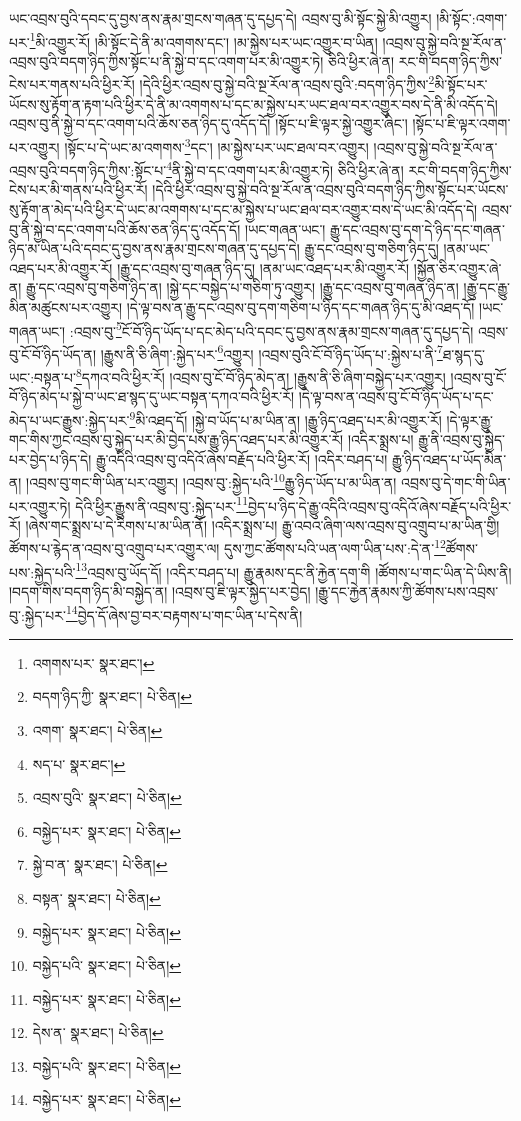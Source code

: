 ཡང་འབྲས་བུའི་དབང་དུ་བྱས་ནས་རྣམ་གྲངས་གཞན་དུ་དཔྱད་དེ། འབྲས་བུ་མི་སྟོང་སྐྱེ་མི་འགྱུར། །མི་སྟོང་:འགག་པར་\footnote{འགགས་པར་  སྣར་ཐང་། }མི་འགྱུར་རོ། །མི་སྟོང་དེ་ནི་མ་འགགས་དང་། །མ་སྐྱེས་པར་ཡང་འགྱུར་བ་ཡིན། །འབྲས་བུ་སྐྱེ་བའི་སྔ་རོལ་ན་འབྲས་བུའི་བདག་ཉིད་ཀྱིས་སྟོང་པ་ནི་སྐྱེ་བ་དང་འགག་པར་མི་འགྱུར་ཏེ། ཅིའི་ཕྱིར་ཞེ་ན། རང་གི་བདག་ཉིད་ཀྱིས་ངེས་པར་གནས་པའི་ཕྱིར་རོ། །དེའི་ཕྱིར་འབྲས་བུ་སྐྱེ་བའི་སྔ་རོལ་ན་འབྲས་བུའི་:བདག་ཉིད་ཀྱིས་\footnote{བདག་ཉིད་ཀྱི་  སྣར་ཐང་།  པེ་ཅིན། }མི་སྟོང་པར་ཡོངས་སུ་རྟོག་ན་རྟག་པའི་ཕྱིར་དེ་ནི་མ་འགགས་པ་དང་མ་སྐྱེས་པར་ཡང་ཐལ་བར་འགྱུར་བས་དེ་ནི་མི་འདོད་དེ། འབྲས་བུ་ནི་སྐྱེ་བ་དང་འགག་པའི་ཆོས་ཅན་ཉིད་དུ་འདོད་དོ། །སྟོང་པ་ཇི་ལྟར་སྐྱེ་འགྱུར་ཞིང་། །སྟོང་པ་ཇི་ལྟར་འགག་པར་འགྱུར། །སྟོང་པ་དེ་ཡང་མ་འགགས་\footnote{འགག་  སྣར་ཐང་།  པེ་ཅིན། }དང་། །མ་སྐྱེས་པར་ཡང་ཐལ་བར་འགྱུར། །འབྲས་བུ་སྐྱེ་བའི་སྔ་རོལ་ན་འབྲས་བུའི་བདག་ཉིད་ཀྱིས་:སྟོང་པ་\footnote{སད་པ་  སྣར་ཐང་། }ནི་སྐྱེ་བ་དང་འགག་པར་མི་འགྱུར་ཏེ། ཅིའི་ཕྱིར་ཞེ་ན། རང་གི་བདག་ཉིད་ཀྱིས་ངེས་པར་མི་གནས་པའི་ཕྱིར་རོ། །དེའི་ཕྱིར་འབྲས་བུ་སྐྱེ་བའི་སྔ་རོལ་ན་འབྲས་བུའི་བདག་ཉིད་ཀྱིས་སྟོང་པར་ཡོངས་སུ་རྟོག་ན་མེད་པའི་ཕྱིར་དེ་ཡང་མ་འགགས་པ་དང་མ་སྐྱེས་པ་ཡང་ཐལ་བར་འགྱུར་བས་དེ་ཡང་མི་འདོད་དེ། འབྲས་བུ་ནི་སྐྱེ་བ་དང་འགག་པའི་ཆོས་ཅན་ཉིད་དུ་འདོད་དོ། །ཡང་གཞན་ཡང་། རྒྱུ་དང་འབྲས་བུ་དག་དེ་ཉིད་དང་གཞན་ཉིད་མ་ཡིན་པའི་དབང་དུ་བྱས་ནས་རྣམ་གྲངས་གཞན་དུ་དཔྱད་དེ། རྒྱུ་དང་འབྲས་བུ་གཅིག་ཉིད་དུ། །ནམ་ཡང་འཐད་པར་མི་འགྱུར་རོ། །རྒྱུ་དང་འབྲས་བུ་གཞན་ཉིད་དུ། །ནམ་ཡང་འཐད་པར་མི་འགྱུར་རོ། །སྐྱོན་ཅིར་འགྱུར་ཞེ་ན། རྒྱུ་དང་འབྲས་བུ་གཅིག་ཉིད་ན། །སྐྱེ་དང་བསྐྱེད་པ་གཅིག་ཏུ་འགྱུར། །རྒྱུ་དང་འབྲས་བུ་གཞན་ཉིད་ན། །རྒྱུ་དང་རྒྱུ་མིན་མཚུངས་པར་འགྱུར། །དེ་ལྟ་བས་ན་རྒྱུ་དང་འབྲས་བུ་དག་གཅིག་པ་ཉིད་དང་གཞན་ཉིད་དུ་མི་འཐད་དོ། །ཡང་གཞན་ཡང་། :འབྲས་བུ་\footnote{འབྲས་བུའི་  སྣར་ཐང་།  པེ་ཅིན། }ངོ་བོ་ཉིད་ཡོད་པ་དང་མེད་པའི་དབང་དུ་བྱས་ནས་རྣམ་གྲངས་གཞན་དུ་དཔྱད་དེ། འབྲས་བུ་ངོ་བོ་ཉིད་ཡོད་ན། །རྒྱུས་ནི་ཅི་ཞིག་:སྐྱེད་པར་\footnote{བསྐྱེད་པར་  སྣར་ཐང་།  པེ་ཅིན། }འགྱུར། །འབྲས་བུའི་ངོ་བོ་ཉིད་ཡོད་པ་:སྐྱེས་པ་ནི་\footnote{སྐྱེ་བ་ན་  སྣར་ཐང་།  པེ་ཅིན། }ཐ་སྙད་དུ་ཡང་:བསྟན་པ་\footnote{བསྟན་  སྣར་ཐང་།  པེ་ཅིན། }དཀའ་བའི་ཕྱིར་རོ། །འབྲས་བུ་ངོ་བོ་ཉིད་མེད་ན། །རྒྱུས་ནི་ཅི་ཞིག་བསྐྱེད་པར་འགྱུར། །འབྲས་བུ་ངོ་བོ་ཉིད་མེད་པ་སྐྱེ་བ་ཡང་ཐ་སྙད་དུ་ཡང་བསྟན་དཀའ་བའི་ཕྱིར་རོ། །དེ་ལྟ་བས་ན་འབྲས་བུ་ངོ་བོ་ཉིད་ཡོད་པ་དང་མེད་པ་ཡང་རྒྱུས་:སྐྱེད་པར་\footnote{བསྐྱེད་པར་  སྣར་ཐང་།  པེ་ཅིན། }མི་འཐད་དོ། །སྐྱེ་བ་ཡོད་པ་མ་ཡིན་ན། །རྒྱུ་ཉིད་འཐད་པར་མི་འགྱུར་རོ། །དེ་ལྟར་རྒྱུ་གང་གིས་ཀྱང་འབྲས་བུ་སྐྱེད་པར་མི་བྱེད་པས་རྒྱུ་ཉིད་འཐད་པར་མི་འགྱུར་རོ། །འདིར་སྨྲས་པ། རྒྱུ་ནི་འབྲས་བུ་སྐྱེད་པར་བྱེད་པ་ཉིད་དེ། རྒྱུ་འདིའི་འབྲས་བུ་འདིའོ་ཞེས་བརྗོད་པའི་ཕྱིར་རོ། །འདིར་བཤད་པ། རྒྱུ་ཉིད་འཐད་པ་ཡོད་མིན་ན། །འབྲས་བུ་གང་གི་ཡིན་པར་འགྱུར། །འབྲས་བུ་:སྐྱེད་པའི་\footnote{བསྐྱེད་པའི་  སྣར་ཐང་།  པེ་ཅིན། }རྒྱུ་ཉིད་ཡོད་པ་མ་ཡིན་ན། འབྲས་བུ་དེ་གང་གི་ཡིན་པར་འགྱུར་ཏེ། དེའི་ཕྱིར་རྒྱུས་ནི་འབྲས་བུ་:སྐྱེད་པར་\footnote{བསྐྱེད་པར་  སྣར་ཐང་།  པེ་ཅིན། }བྱེད་པ་ཉིད་དེ་རྒྱུ་འདིའི་འབྲས་བུ་འདིའོ་ཞེས་བརྗོད་པའི་ཕྱིར་རོ། །ཞེས་གང་སྨྲས་པ་དེ་རིགས་པ་མ་ཡིན་ནོ། །འདིར་སྨྲས་པ། རྒྱུ་འབའ་ཞིག་ལས་འབྲས་བུ་འགྲུབ་པ་མ་ཡིན་གྱི། ཚོགས་པ་རྙེད་ན་འབྲས་བུ་འགྲུབ་པར་འགྱུར་ལ། དུས་ཀྱང་ཚོགས་པའི་ཡན་ལག་ཡིན་པས་:དེ་ན་\footnote{དེས་ན་  སྣར་ཐང་།  པེ་ཅིན། }ཚོགས་པས་:སྐྱེད་པའི་\footnote{བསྐྱེད་པའི་  སྣར་ཐང་།  པེ་ཅིན། }འབྲས་བུ་ཡོད་དོ། །འདིར་བཤད་པ། རྒྱུ་རྣམས་དང་ནི་རྐྱེན་དག་གི །ཚོགས་པ་གང་ཡིན་དེ་ཡིས་ནི། །བདག་གིས་བདག་ཉིད་མི་བསྐྱེད་ན། །འབྲས་བུ་ཇི་ལྟར་སྐྱེད་པར་བྱེད། །རྒྱུ་དང་རྐྱེན་རྣམས་ཀྱི་ཚོགས་པས་འབྲས་བུ་:སྐྱེད་པར་\footnote{བསྐྱེད་པར་  སྣར་ཐང་།  པེ་ཅིན། }བྱེད་དོ་ཞེས་བྱ་བར་བརྟགས་པ་གང་ཡིན་པ་དེས་ནི། 